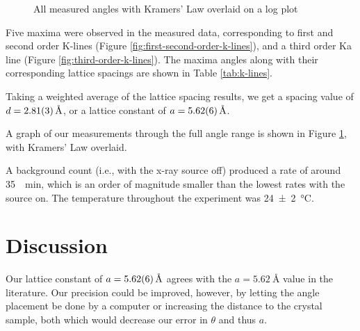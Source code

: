 \documentclass[a4paper]{scrartcl}
\begin{document}
\begin{figure}
    \centering
    \caption{All measured angles with Kramers' Law overlaid on a log plot}
    \label{fig:all-data}
\end{figure}

Five maxima were observed in the measured data, corresponding to first and second order K-lines (Figure \ref{fig:first-second-order-k-lines}), and a third order K\textgreek{a} line (Figure \ref{fig:third-order-k-lines}). The maxima angles along with their corresponding lattice spacings are shown in Table \ref{tab:k-lines}.

Taking a weighted average of the lattice spacing results, we get a spacing value of \(d = \SI{2.81 \pm 0.03}{\angstrom}\), or a lattice constant of \(a = \SI{5.62 \pm 0.06}{\angstrom}\).

A graph of our measurements through the full angle range is shown in Figure \ref{fig:all-data}, with Kramers' Law overlaid.

A background count (i.e., with the x-ray source off) produced a rate of around \SI{35}{\per\minute}, which is an order of magnitude smaller than the lowest rates with the source on. The temperature throughout the experiment was \SI{24 \pm 2}{\degreeCelsius}.

\section{Discussion}
Our lattice constant of \(a = \SI{5.62 \pm 0.06}{\angstrom}\) agrees with the \(a = \SI{5.62}{\angstrom}\) value in the literature\cite{Mott1940}. Our precision could be improved, however, by letting the angle placement be done by a computer or increasing the distance to the crystal sample, both which would decrease our error in \(\theta\) and thus \(a\).
\end{document}
